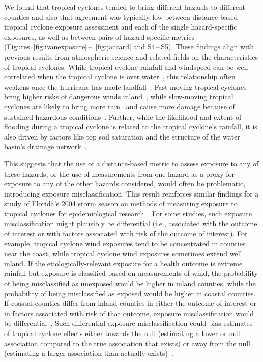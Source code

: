 We found that tropical cyclones tended to bring different hazards to different
counties and also that agreement was typically low between distance-based
tropical cyclone exposure assessment and each of the single hazard-specific
exposures, as well as between pairs of hazard-specific metrics
(Figures~\ref{fig:ivanexposure}\,--\, \ref{fig:jaccard} and S4\,--\,S5).  These
findings align with previous results from atmospheric science and related
fields on the characteristics of tropical cyclones. While tropical cyclone
rainfall and windspeed can be well-correlated when the tropical cyclone is over
water~\parencite{cerveny2000}, this relationship often weakens once the
hurricane has made landfall~\parencite{jiang2008}.  Fast-moving tropical
cyclones bring higher risks of dangerous winds inland~\parencite{kruk2010},
while slow-moving tropical cyclones are likely to bring more
rain~\parencite{rappaport2000} and cause more damage because of sustained
hazardous conditions~\parencite{rezapour2014}. Further, while the likelihood
and extent of flooding during a tropical cyclone is related to the tropical
cyclone's rainfall, it is also driven by factors like top soil saturation and
the structure of the water basin's drainage network~\parencite{chen2015,
rees2001}. 

This suggests that the use of a distance-based metric to assess exposure to any
of these hazards, or the use of measurements from one hazard as a proxy for
exposure to any of the other hazards considered, would often be problematic,
introducing exposure misclassification. This result reinforces similar findings
for a study of Florida's 2004 storm season on methods of measuring exposure to
tropical cyclones for epidemiological
research~\parencite{grabich2015measuring}.  For some studies, such exposure
misclassification might plausibly be differential (i.e., associated with the
outcome of interest or with factors associated with risk of the outcome of
interest).  For example, tropical cyclone wind exposures tend to be
concentrated in counties near the coast, while tropical cyclone wind exposures
sometimes extend well inland.  If the etiologically-relevant exposure for a
health outcome is extreme rainfall but exposure is classified based on
measurements of wind, the probability of being misclassified as unexposed would
be higher in inland counties, while the probability of being misclassified as
exposed would be higher in coastal counties. If coastal counties differ from
inland counties in either the outcome of interest or in factors associated with
risk of that outcome, exposure misclassification would be
differential~\parencite{savitz2016interpreting}.  Such differential exposure
misclassification could bias estimates of tropical cyclone effects either
towards the null (estimating a lower or null association compared to the true
association that exists) or away from the null (estimating a larger association
than actually exists)~\parencite{savitz2016interpreting, armstrong1998effect}.  

